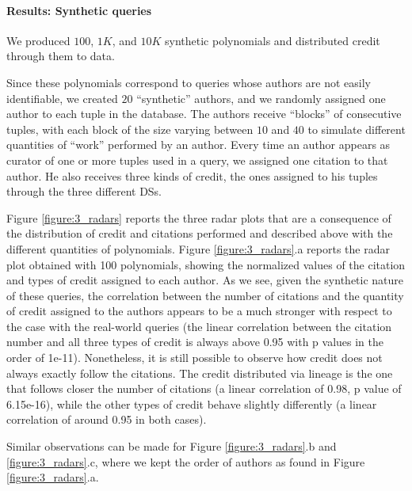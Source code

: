 \paragraph{Results: Synthetic queries}
We produced $100$, $1K$, and $10K$ synthetic polynomials and distributed credit through them to data. 

Since these polynomials correspond to queries whose authors are not easily identifiable, we created $20$ ``synthetic'' authors, and we randomly assigned one author to each tuple in the database. The authors receive ``blocks'' of consecutive tuples, with each block of the size varying between $10$ and $40$ to simulate different quantities of ``work'' performed by an author. 
Every time an author appears as curator of one or more tuples used in a query, we assigned one citation to that author.  
He also receives three kinds of credit, the ones assigned to his tuples through the three different DSs.

Figure \ref{figure:3_radars} reports the three radar plots that are a consequence of the distribution of credit and citations performed and described above with the different quantities of polynomials. 
Figure \ref{figure:3_radars}.a reports the radar plot obtained with 100 polynomials, showing the normalized values of the citation and types of credit assigned to each author. 
As we see, given the synthetic nature of these queries, the correlation between the number of citations and the quantity of credit assigned to the authors appears to be a much stronger with respect to the case with the real-world queries (the linear correlation between the citation number and all three types of credit is always above 0.95 with p values in the order of 1e-11).
Nonetheless, it is still possible to observe how credit does not always exactly follow the citations. 
The credit distributed via lineage is the one that follows closer the number of citations (a linear correlation of 0.98, p value of 6.15e-16), while the other types of credit behave slightly differently (a linear correlation of around 0.95 in both cases).  

Similar observations can be made for Figure \ref{figure:3_radars}.b and \ref{figure:3_radars}.c, where we kept the order of authors as found in Figure \ref{figure:3_radars}.a.

